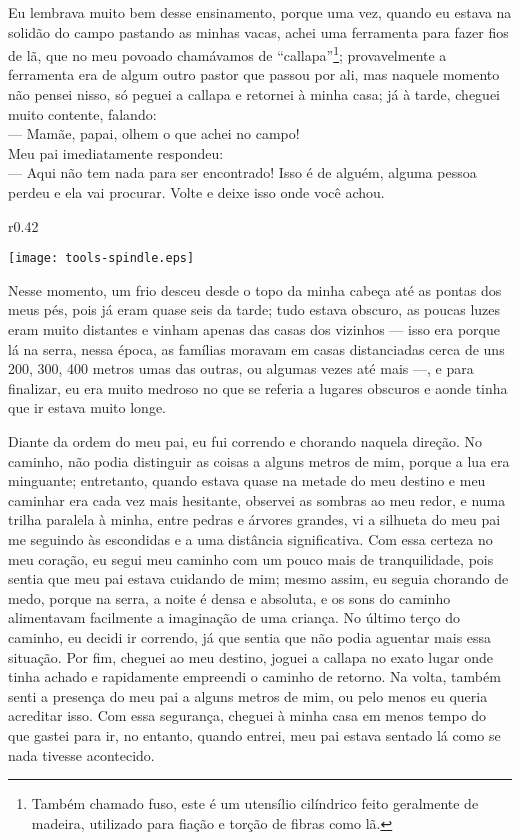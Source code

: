 Eu lembrava muito bem desse ensinamento, porque uma vez, quando eu estava na solidão do campo pastando as minhas vacas, achei uma ferramenta para fazer fios de lã, que no meu povoado chamávamos de ``callapa''\footnote{Também chamado fuso, este é um utensílio cilíndrico feito geralmente de madeira, utilizado para fiação e torção de fibras como lã.}; provavelmente a ferramenta era de algum outro pastor que passou por ali, mas naquele momento não pensei nisso, só peguei a callapa e retornei à minha casa; já à tarde, cheguei  muito contente, falando:\\\indent
--- Mamãe, papai, olhem o que achei no campo!\\\indent
Meu pai imediatamente respondeu:\\\indent
--- Aqui não tem nada para ser encontrado! Isso é de alguém, alguma pessoa perdeu e ela vai procurar. Volte e deixe isso onde você achou.

\ifdefined\EnableIncludeImages
\begin{wrapfigure}{r}{0.42\textwidth}
  \begin{center}
  \vspace{-10pt}
    \texttt{[image: tools-spindle.eps]}
  \end{center}
  \vspace{-20pt}
\end{wrapfigure}
\fi
Nesse momento, um frio desceu desde o topo da minha cabeça até as pontas dos meus pés, pois já eram quase seis da tarde; tudo estava obscuro, as poucas luzes eram muito distantes e vinham apenas das casas dos vizinhos --- isso era porque lá na serra, nessa época, as famílias moravam em casas distanciadas cerca de uns 200, 300, 400 metros umas das outras, ou algumas vezes até mais ---, e para finalizar, eu era muito medroso no que se referia a lugares obscuros e aonde tinha que ir estava muito longe.

Diante da ordem do meu pai, eu fui correndo e chorando naquela direção. No caminho, não podia distinguir as coisas a alguns metros de mim, porque a lua era minguante; entretanto, quando estava quase na metade do meu destino e meu caminhar era cada vez mais hesitante, observei as sombras ao meu redor, e numa trilha paralela à minha, entre pedras e árvores grandes, vi a silhueta do meu pai me seguindo às escondidas e a uma distância significativa.
Com essa certeza no meu coração, eu segui meu caminho com um pouco mais de tranquilidade, pois sentia que meu pai estava cuidando de mim; mesmo assim, eu seguia chorando de medo, porque na serra, a noite é densa e absoluta, e os sons do caminho alimentavam facilmente a imaginação de uma criança.
No último terço do caminho, eu decidi ir correndo, já que sentia que não podia aguentar mais essa situação. Por fim, cheguei ao meu destino, joguei a callapa no exato lugar onde tinha achado e rapidamente empreendi o caminho de retorno.
Na volta, também senti a presença do meu pai a alguns metros de mim, ou pelo menos eu queria acreditar isso. Com essa segurança, cheguei à minha casa em menos tempo do que gastei para ir, no entanto, quando entrei, meu pai estava sentado lá como se nada tivesse acontecido.


